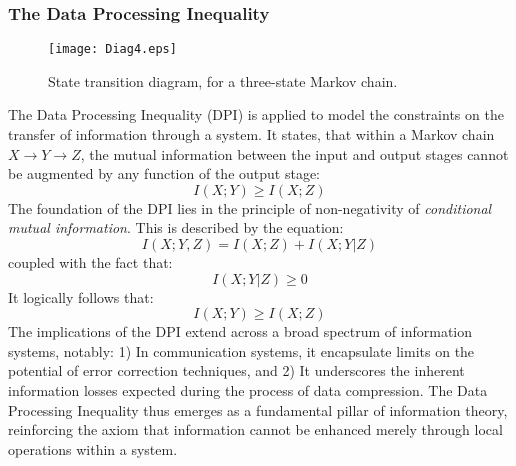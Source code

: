 \documentclass[journal,12pt,onecolumn,draftclsnofoot,]{IEEEtran}
\begin{document}
	\subsubsection{The Data Processing Inequality}
	\begin{figure}
		\centering
		\texttt{[image: Diag4.eps]} 
		\caption{State transition diagram, for a three-state Markov chain.}
	\end{figure}
	The Data Processing Inequality (DPI) is applied to model the constraints on the transfer of information through a system. It states, that within a Markov chain \(X \rightarrow Y \rightarrow Z\), the mutual information between the input and output stages cannot be augmented by any function of the output stage:
	\[ I(X; Y) \geq I(X; Z) \]
	The foundation of the DPI lies in the principle of non-negativity of \emph{conditional mutual information}. This is described by the equation:
	\begin{equation}
		I(X; Y, Z) = I(X; Z) + I(X; Y | Z) 
	\end{equation}
	coupled with the fact that:
	\begin{equation}
		I(X; Y | Z) \geq 0
	\end{equation}
	It logically follows that:
	\begin{equation}
		I(X; Y) \geq I(X; Z)
	\end{equation}
	The implications of the DPI extend across a broad spectrum of information systems, notably: 1) In communication systems, it encapsulate limits on the potential of error correction techniques, and 2) It underscores the inherent information losses expected during the process of data compression. The Data Processing Inequality thus emerges as a fundamental pillar of information theory, reinforcing the axiom that information cannot be enhanced merely through local operations within a system.
	
\end{document}
